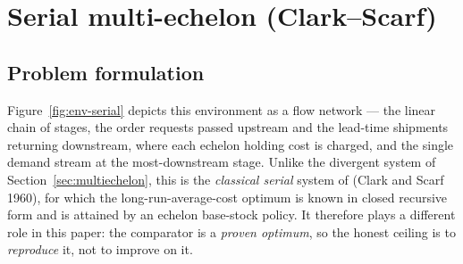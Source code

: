 \documentclass[11pt]{article}
\begin{document}
\section{Serial multi-echelon (Clark--Scarf)}
\label{sec:serial}

\subsection{Problem formulation}

Figure~\ref{fig:env-serial} depicts this environment as a flow network --- the linear chain of stages,
the order requests passed upstream and the lead-time shipments returning downstream, where each
echelon holding cost is charged, and the single demand stream at the most-downstream stage. Unlike the
divergent system of Section~\ref{sec:multiechelon}, this is the \emph{classical serial} system of
\citet{snyder2019foundations} (Clark and Scarf 1960), for which the long-run-average-cost optimum is
known in closed recursive form and is attained by an echelon base-stock policy. It therefore plays a
different role in this paper: the comparator is a \emph{proven optimum}, so the honest ceiling is to
\emph{reproduce} it, not to improve on it.
\end{document}

